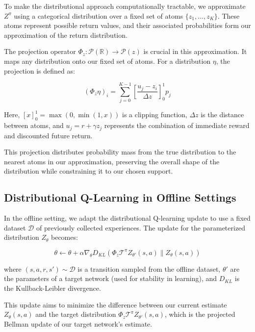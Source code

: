 \documentclass[12pt]{article}
\begin{document}
To make the distributional approach computationally tractable, we approximate $Z^\pi$ using a categorical distribution over a fixed set of atoms $\{z_1, ..., z_K\}$. These atoms represent possible return values, and their associated probabilities form our approximation of the return distribution.

The projection operator $\Phi_z : \mathcal{P}(\mathbb{R}) \to \mathcal{P}(z)$ is crucial in this approximation. It maps any distribution onto our fixed set of atoms. For a distribution $\eta$, the projection is defined as:

\begin{equation}
(\Phi_z \eta)_i = \sum_{j=0}^{K-1} [\frac{u_j - z_i}{\Delta z}]_0^1 p_j
\end{equation}

Here, $[x]_0^1 = \max(0, \min(1, x))$ is a clipping function, $\Delta z$ is the distance between atoms, and $u_j = r + \gamma z_j$ represents the combination of immediate reward and discounted future return.

This projection distributes probability mass from the true distribution to the nearest atoms in our approximation, preserving the overall shape of the distribution while constraining it to our chosen support.

\subsection{Distributional Q-Learning in Offline Settings}

In the offline setting, we adapt the distributional Q-learning update to use a fixed dataset $\mathcal{D}$ of previously collected experiences. The update for the parameterized distribution $Z_\theta$ becomes:

\begin{equation}
\theta \leftarrow \theta + \alpha \nabla_\theta D_{KL}(\Phi_z \mathcal{T}^\pi Z_{\theta'}(s, a) \| Z_\theta(s, a))
\end{equation}

where $(s, a, r, s') \sim \mathcal{D}$ is a transition sampled from the offline dataset, $\theta'$ are the parameters of a target network (used for stability in learning), and $D_{KL}$ is the Kullback-Leibler divergence.

This update aims to minimize the difference between our current estimate $Z_\theta(s, a)$ and the target distribution $\Phi_z \mathcal{T}^\pi Z_{\theta'}(s, a)$, which is the projected Bellman update of our target network's estimate.
\end{document}
